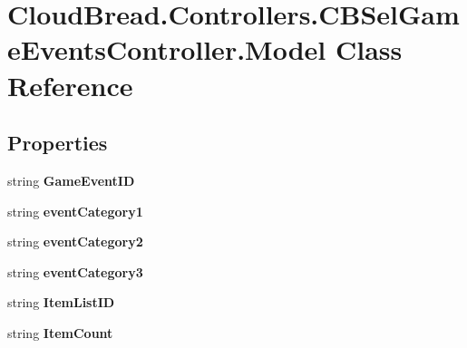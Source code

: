 \hypertarget{a00166}{}\section{Cloud\+Bread.\+Controllers.\+C\+B\+Sel\+Game\+Events\+Controller.\+Model Class Reference}
\label{a00166}
\subsection*{Properties}
\begin{DoxyCompactItemize}
\item 
string {\bfseries Game\+Event\+ID}\hypertarget{a00166_a81caaf7dbab2694c6b06a49de7cd41e2}{}\label{a00166_a81caaf7dbab2694c6b06a49de7cd41e2}

\item 
string {\bfseries event\+Category1}\hypertarget{a00166_a18dbb87c27a859c7b3244aa556dfb7ed}{}\label{a00166_a18dbb87c27a859c7b3244aa556dfb7ed}

\item 
string {\bfseries event\+Category2}\hypertarget{a00166_a8ad17906f474bd201b4a3f528cb40dda}{}\label{a00166_a8ad17906f474bd201b4a3f528cb40dda}

\item 
string {\bfseries event\+Category3}\hypertarget{a00166_a51b3dadf3d63ea8f0392b5438fb24f19}{}\label{a00166_a51b3dadf3d63ea8f0392b5438fb24f19}

\item 
string {\bfseries Item\+List\+ID}\hypertarget{a00166_a66a730cf406a970bdfe202dc0822c6e8}{}\label{a00166_a66a730cf406a970bdfe202dc0822c6e8}

\item 
string {\bfseries Item\+Count}\hypertarget{a00166_ad439462d3cd07c7ccfcc4a08a15e2755}{}\label{a00166_ad439462d3cd07c7ccfcc4a08a15e2755}


\end{DoxyCompactItemize}
